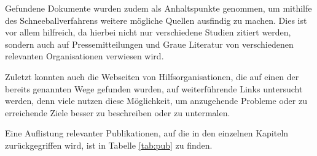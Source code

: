 Gefundene Dokumente wurden zudem als Anhaltspunkte genommen, um mithilfe des Schneeballverfahrens weitere mögliche Quellen ausfindig zu machen. Dies ist vor allem hilfreich, da hierbei nicht nur verschiedene Studien zitiert werden, sondern auch auf Pressemitteilungen und Graue Literatur von verschiedenen relevanten Organisationen verwiesen wird.

Zuletzt konnten auch die Webseiten von Hilfsorganisationen, die auf einen der bereits genannten Wege gefunden wurden, auf weiterführende Links untersucht werden, denn viele nutzen diese Möglichkeit, um anzugehende Probleme oder zu erreichende Ziele besser zu beschreiben oder zu untermalen.

Eine Auflistung relevanter Publikationen, auf die in den einzelnen Kapiteln zurückgegriffen wird, ist in Tabelle \ref{tab:pub} zu finden.

